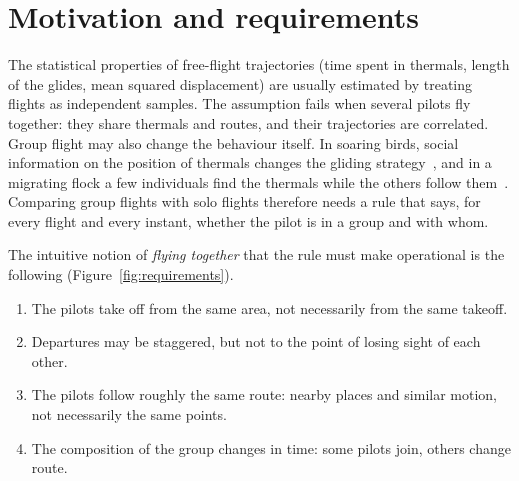 \section{Motivation and requirements}\label{sec:motivation}

The statistical properties of free-flight trajectories (time spent in thermals, length of the
glides, mean squared displacement) are usually estimated by treating flights as independent
samples. The assumption fails when several pilots fly together: they share thermals and routes,
and their trajectories are correlated. Group flight may also change the behaviour itself. In
soaring birds, social information on the position of thermals changes the gliding
strategy~\cite{williams2018}, and in a migrating flock a few individuals find the thermals while
the others follow them~\cite{flack2018,nagy2018}. Comparing group flights with solo flights
therefore needs a rule that says, for every flight and every instant, whether the pilot is in a
group and with whom.

The intuitive notion of \emph{flying together} that the rule must make operational is the
following (Figure~\ref{fig:requirements}).
\begin{enumerate}[label=(R\arabic*), leftmargin=3.2em]
  \item The pilots take off from the same area, not necessarily from the same takeoff.
  \item Departures may be staggered, but not to the point of losing sight of each other.
  \item The pilots follow roughly the same route: nearby places and similar motion, not
        necessarily the same points.
  \item The composition of the group changes in time: some pilots join, others change route.
\end{enumerate}


